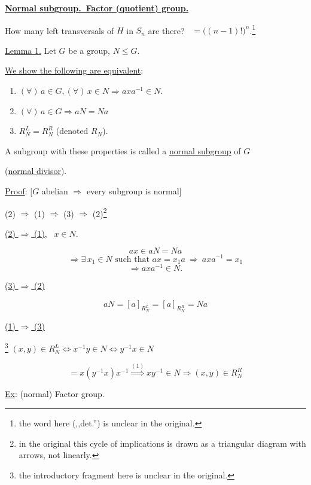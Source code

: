 \documentclass[12pt]{article}
\begin{document}
\noindent\underline{\textbf{Normal subgroup.\ Factor (quotient) group.}}

\bigskip
\noindent How many left transversals of $H$ in $S_n$ are there? \ $=\big((n-1)!\big)^n$.\footnote{the word here (,,det.'') is unclear in the original.}

\bigskip
\noindent\underline{Lemma 1.} Let $G$ be a group, $N\leq G$.

\noindent\underline{We show the following are equivalent}:

\begin{enumerate}
\item[(1)] $(\forall)\, a\in G, (\forall)\, x\in N \Rightarrow axa^{-1}\in N$.
\item[(2)] $(\forall)\, a\in G \Rightarrow aN=Na$
\item[(3)] $R_N^L = R_N^R$ (denoted $R_N$).
\end{enumerate}

\noindent A subgroup with these properties is called a \underline{normal subgroup} of $G$

\noindent (\underline{normal divisor}).

\bigskip
\noindent\underline{Proof}: $\big[G$ abelian $\Rightarrow$ every subgroup is normal$\big]$

\bigskip
\begin{center}
(2) $\Rightarrow$ (1) $\Rightarrow$ (3) $\Rightarrow$ (2)\footnote{in the original this cycle of implications is drawn as a triangular diagram with arrows, not linearly.}
\end{center}

\bigskip
\noindent\underline{(2) $\Rightarrow$ (1)}, \ $x\in N$.

\[
ax\in aN=Na
\]
\[
\Rightarrow \exists\, x_1\in N \text{ such that } ax=x_1a \ \Rightarrow \ axa^{-1}=x_1
\]
\[
\Rightarrow axa^{-1}\in N.
\]

\bigskip
\noindent\underline{(3) $\Rightarrow$ (2)}

\[
aN = [a]_{R_N^L} = [a]_{R_N^R} = Na
\]

\bigskip
\noindent\underline{(1) $\Rightarrow$ (3)}

\noindent\footnote{the introductory fragment here is unclear in the original.} $(x,y)\in R_N^L \Leftrightarrow x^{-1}y\in N \Leftrightarrow y^{-1}x\in N$

\[
= x(y^{-1}x)x^{-1} \overset{(1)}{\Longrightarrow} xy^{-1}\in N \Rightarrow (x,y)\in R_N^R
\]

\bigskip
\noindent\underline{Ex}: (normal) Factor group.
\end{document}
